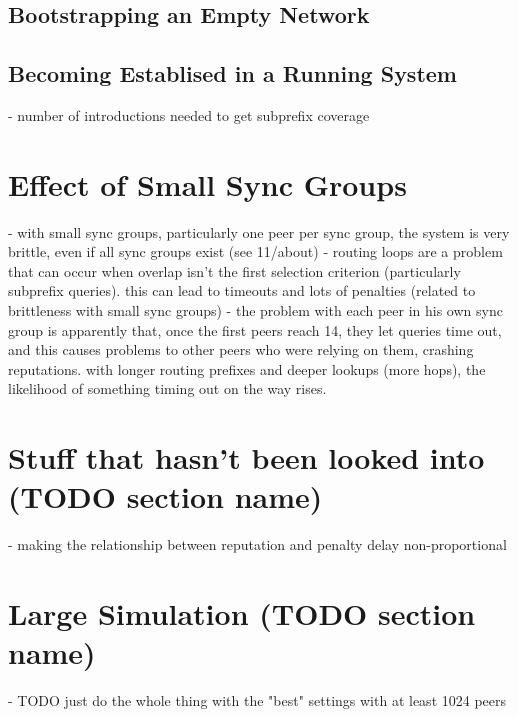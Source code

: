 \subsection{Bootstrapping an Empty Network}
\subsection{Becoming Establised in a Running System}
- number of introductions needed to get subprefix coverage

\section{Effect of Small Sync Groups}
\label{sec:rep_avail_small_sync_groups}
- with small sync groups, particularly one peer per sync group, the system is
  very brittle, even if all sync groups exist (see 11/about)
- routing loops are a problem that can occur when overlap isn't the first
  selection criterion (particularly subprefix queries). this can lead to
  timeouts and lots of penalties (related to brittleness with small sync groups)
- the problem with each peer in his own sync group is apparently that, once the
  first peers reach 14, they let queries time out, and this causes problems to
  other peers who were relying on them, crashing reputations. with longer
  routing prefixes and deeper lookups (more hops), the likelihood of something
  timing out on the way rises.

\section{Stuff that hasn't been looked into (TODO section name)}
- making the relationship between reputation and penalty delay non-proportional

\section{Large Simulation (TODO section name)}
- TODO just do the whole thing with the "best" settings with at least 1024 peers


